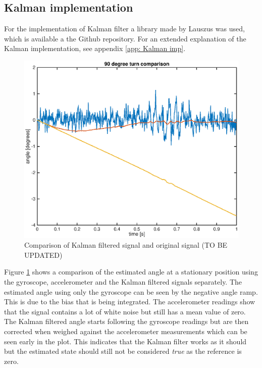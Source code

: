 \documentclass[a4paper,11pt]{kth-mag}
\begin{document}
\subsection{Kalman implementation}
For the implementation of Kalman filter a library made by Lauszus was used, which is available a the Github repository\cite{TKJkalman}. For an extended explanation of the Kalman implementation, see appendix \ref{app: Kalman imp}.

\begin{figure}[!htb]
\centering
\includegraphics[width = \textwidth]{Kalmancomparisonstat.eps}
\caption{Comparison of Kalman filtered signal and original signal (TO BE UPDATED)}
\label{Fig: Kalman comparison}
\end{figure}

Figure \ref{Fig: Kalman comparison} shows a comparison of the estimated angle at a stationary position using the gyroscope, accelerometer and the Kalman filtered signals separately. The estimated angle using only the gyroscope can be seen by the negative angle ramp. This is due to the bias that is being integrated. The accelerometer readings show that the signal contains a lot of white noise but still has a mean value of zero. 
The Kalman filtered angle starts following the gyroscope readings but are then corrected when weighed against the accelerometer measurements which can be seen early in the plot. 
This indicates that the Kalman filter works as it should but the estimated state should still not be considered \textit{true} as the reference is zero. 
\end{document}
